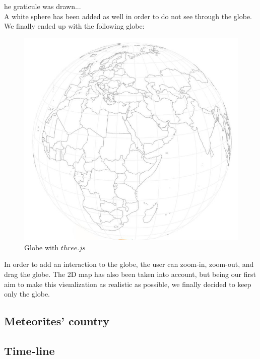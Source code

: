 \documentclass[10pt,conference,compsocconf]{IEEEtran}
\begin{document}
he graticule was drawn...\\

A white sphere has been added as well in order to do not see through the globe.
We finally ended up with the following globe: 
\begin{figure}[H]
  \centering
  \includegraphics[width=\columnwidth]{globe.jpg}
  \vspace{-3mm}
  \caption{Globe with $three.js$}
  \label{fig:globe}
\end{figure}

In order to add an interaction to the globe, the user can zoom-in, zoom-out, and drag the globe. 
The 2D map has also been taken into account, but being our first aim to make this visualization as realistic as possible, we finally decided to keep only the globe. 

\subsection{Meteorites' country}



\subsection{Time-line}
\end{document}
